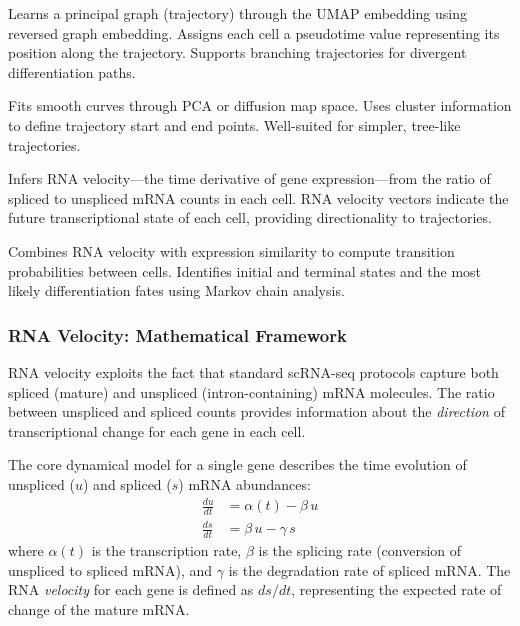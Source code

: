 \begin{description}[style=nextline]
  \item[\software{Monocle3}] Learns a principal graph (trajectory) through the
    UMAP embedding using reversed graph embedding. Assigns each cell a
    pseudotime value representing its position along the trajectory. Supports
    branching trajectories for divergent differentiation paths.
  \item[\software{Slingshot}] Fits smooth curves through PCA or diffusion map
    space. Uses cluster information to define trajectory start and end points.
    Well-suited for simpler, tree-like trajectories.
  \item[\software{scVelo}] Infers RNA velocity---the time derivative of gene
    expression---from the ratio of spliced to unspliced mRNA counts in each
    cell. RNA velocity vectors indicate the future transcriptional state of
    each cell, providing directionality to trajectories.
  \item[\software{CellRank}] Combines RNA velocity with expression similarity
    to compute transition probabilities between cells. Identifies initial and
    terminal states and the most likely differentiation fates using Markov chain
    analysis.
\end{description}

\subsubsection{RNA Velocity: Mathematical Framework}
\label{subsec:scrnaseq:rna_velocity}

RNA velocity exploits the fact that standard scRNA-seq protocols capture both
spliced (mature) and unspliced (intron-containing) mRNA molecules. The ratio
between unspliced and spliced counts provides information about the
\emph{direction} of transcriptional change for each gene in each cell.

The core dynamical model for a single gene describes the time evolution of
unspliced ($u$) and spliced ($s$) mRNA abundances:
\begin{align}
  \label{eq:scrnaseq:velocity_unspliced}
  \frac{du}{dt} &= \alpha(t) - \beta\, u \\
  \label{eq:scrnaseq:velocity_spliced}
  \frac{ds}{dt} &= \beta\, u - \gamma\, s
\end{align}
where $\alpha(t)$ is the transcription rate, $\beta$ is the splicing rate
(conversion of unspliced to spliced mRNA), and $\gamma$ is the degradation rate
of spliced mRNA. The RNA \emph{velocity} for each gene is defined as $ds/dt$,
representing the expected rate of change of the mature mRNA.

